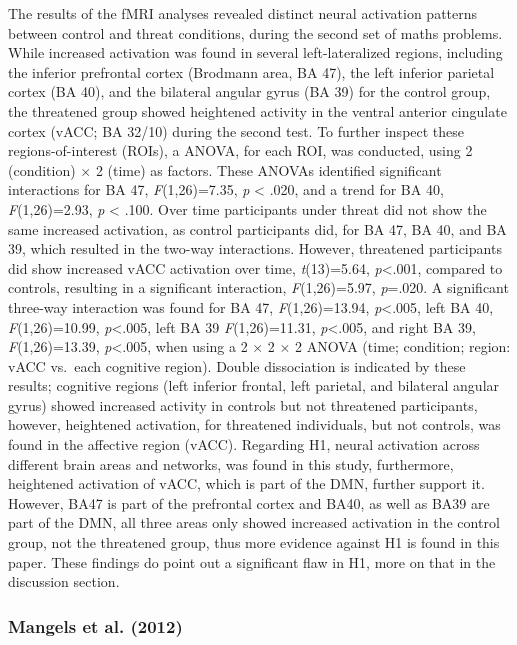 \documentclass[
  stu,floatsintext]{apa7}
\begin{document}
The results of the fMRI analyses revealed distinct neural activation patterns between control and threat conditions, during the second set of maths problems.
While increased activation was found in several left-lateralized regions, including the inferior prefrontal cortex (Brodmann area, BA 47), the left inferior parietal cortex (BA 40), and the bilateral angular gyrus (BA 39) for the control group, the threatened group showed heightened activity in the ventral anterior cingulate cortex (vACC; BA 32/10) during the second test.
To further inspect these regions-of-interest (ROIs), a ANOVA, for each ROI, was conducted, using 2 (condition) \(\times\) 2 (time) as factors.
These ANOVAs identified significant interactions for BA 47, \emph{F}(1,26)=7.35, \emph{p} \textless{} .020, and a trend for BA 40, \emph{F}(1,26)=2.93, \emph{p} \textless{} .100.
Over time participants under threat did not show the same increased activation, as control participants did, for BA 47, BA 40, and BA 39, which resulted in the two-way interactions.
However, threatened participants did show increased vACC activation over time, \emph{t}(13)=5.64, \emph{p}\textless.001, compared to controls, resulting in a significant interaction, \emph{F}(1,26)=5.97, \emph{p}=.020.
A significant three-way interaction was found for BA 47, \emph{F}(1,26)=13.94, \emph{p}\textless.005, left BA 40, \emph{F}(1,26)=10.99, \emph{p}\textless.005, left BA 39 \emph{F}(1,26)=11.31, \emph{p}\textless.005, and right BA 39, \emph{F}(1,26)=13.39, \emph{p}\textless.005, when using a 2 \(\times\) 2 \(\times\) 2 ANOVA (time; condition; region: vACC vs.~each cognitive region).
Double dissociation is indicated by these results; cognitive regions (left inferior frontal, left parietal, and bilateral angular gyrus) showed increased activity in controls but not threatened participants, however, heightened activation, for threatened individuals, but not controls, was found in the affective region (vACC).
Regarding H1, neural activation across different brain areas and networks, was found in this study, furthermore, heightened activation of vACC, which is part of the DMN, further support it.
However, BA47 is part of the prefrontal cortex and BA40, as well as BA39 are part of the DMN, all three areas only showed increased activation in the control group, not the threatened group, thus more evidence against H1 is found in this paper.
These findings do point out a significant flaw in H1, more on that in the discussion section.

\subsubsection{Mangels et al. (2012)}\label{mangelsemotionblockspath2012}
\end{document}
